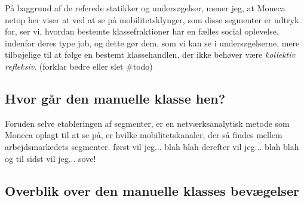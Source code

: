 På baggrund af de referede statikker og undersøgelser, mener jeg, at Moneca netop her viser at ved at se på mobilitetsklynger, som disse segmenter er udtryk for, ser vi, hvordan bestemte klassefraktioner har en fælles social oplevelse, indenfor deres type job, og dette gør dem, som vi kan se i undersøgelserne, mere tilbøjelige til at følge en bestemt klassehandlen, der ikke behøver være \emph{kollektiv refleksiv}. (forklar bedre eller slet \#todo) 



\begin{landscape}


%
\section{Hvor går den manuelle klasse hen? \label{sec delanalyse3 manuelle arbejdsklasse hvorhen mobilitet}}
%




Foruden selve etableringen af segmenter, er en netværksanalytisk metode som Moneca oplagt til at se på, er hvilke mobilitetskanaler, der så findes mellem arbejdsmarkedets segmenter.  først vil jeg... blah blah derefter vil jeg... blah blah og til sidst vil jeg... sove!




%
\subsection{Overblik over den manuelle klasses bevægelser \label{subsec_}}
%



\end{landscape}
